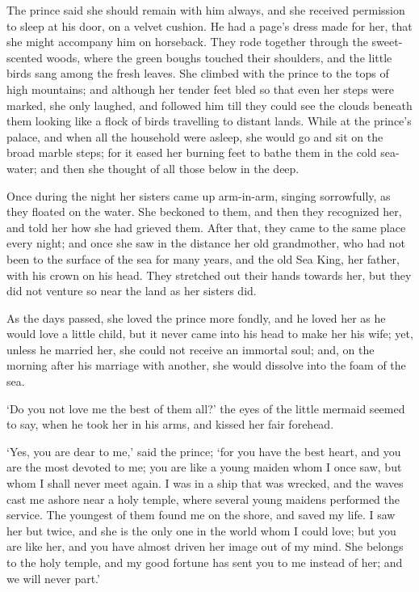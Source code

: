The prince said she should remain with him always, and she
received permission to sleep at his door, on a velvet cushion. 
He
had a page's dress made for her, that she might accompany him on
horseback. 
They rode together through the sweet-scented woods, where
the green boughs touched their shoulders, and the little birds sang
among the fresh leaves. 
She climbed with the prince to the tops of
high mountains; and although her tender feet bled so that even her
steps were marked, she only laughed, and followed him till they
could see the clouds beneath them looking like a flock of birds
travelling to distant lands. 
While at the prince's palace, and when
all the household were asleep, she would go and sit on the broad
marble steps; for it eased her burning feet to bathe them in the
cold sea-water; and then she thought of all those below in the deep.

Once during the night her sisters came up arm-in-arm, singing
sorrowfully, as they floated on the water. 
She beckoned to them, and
then they recognized her, and told her how she had grieved them. 
After
that, they came to the same place every night; and once she saw in the
distance her old grandmother, who had not been to the surface of the
sea for many years, and the old Sea King, her father, with his crown
on his head. 
They stretched out their hands towards her, but they
did not venture so near the land as her sisters did.

As the days passed, she loved the prince more fondly, and he loved
her as he would love a little child, but it never came into his head
to make her his wife; yet, unless he married her, she could not
receive an immortal soul; and, on the morning after his marriage
with another, she would dissolve into the foam of the sea.

`Do you not love me the best of them all?' the eyes of the
little mermaid seemed to say, when he took her in his arms, and kissed
her fair forehead.

`Yes, you are dear to me,' said the prince; `for you have the best
heart, and you are the most devoted to me; you are like a young maiden
whom I once saw, but whom I shall never meet again. 
I was in a ship
that was wrecked, and the waves cast me ashore near a holy temple,
where several young maidens performed the service. 
The youngest of
them found me on the shore, and saved my life. 
I saw her but twice,
and she is the only one in the world whom I could love; but you are
like her, and you have almost driven her image out of my mind. 
She
belongs to the holy temple, and my good fortune has sent you to me
instead of her; and we will never part.'

